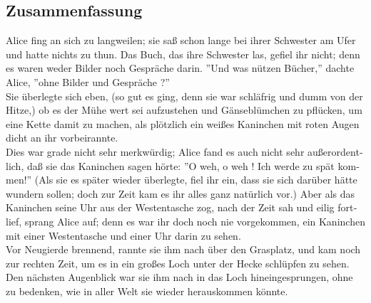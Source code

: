 \begin{otherlanguage}{ngerman}
	
	
	\chapter*{Zusammenfassung}
	
	Alice fing an sich zu langweilen; sie saß schon lange bei ihrer Schwester am Ufer und hatte nichts zu thun. Das Buch, das ihre Schwester las, gefiel ihr nicht; denn es waren weder Bilder noch Gespräche darin. ''Und was nützen Bücher,'' dachte Alice, ''ohne Bilder und Gespräche ?''\\
	
	Sie überlegte sich eben, (so gut es ging, denn sie war schläfrig und dumm von der Hitze,) ob es der Mühe wert sei aufzustehen und Gänseblümchen zu pflücken, um eine Kette damit zu machen, als plötzlich ein weißes Kaninchen mit roten Augen dicht an ihr vorbeirannte.\\
	
	Dies war grade nicht sehr merkwürdig; Alice fand es auch nicht sehr außerordentlich, daß sie das Kaninchen sagen hörte: ''O weh, o weh ! Ich werde zu spät kommen!'' (Als sie es später wieder überlegte, fiel ihr ein, dass sie sich darüber hätte wundern sollen; doch zur Zeit kam es ihr alles ganz natürlich vor.) Aber als das Kaninchen seine Uhr aus der Westentasche zog, nach der Zeit sah und eilig fortlief, sprang Alice auf; denn es war ihr doch noch nie vorgekommen, ein Kaninchen mit einer Westentasche und einer Uhr darin zu sehen.\\
	
	Vor Neugierde brennend, rannte sie ihm nach über den Grasplatz, und kam noch zur rechten Zeit, um es in ein großes Loch unter der Hecke schlüpfen zu sehen. Den nächsten Augenblick war sie ihm nach in das Loch hineingesprungen, ohne zu bedenken, wie in aller Welt sie wieder herauskommen könnte.

\end{otherlanguage}
